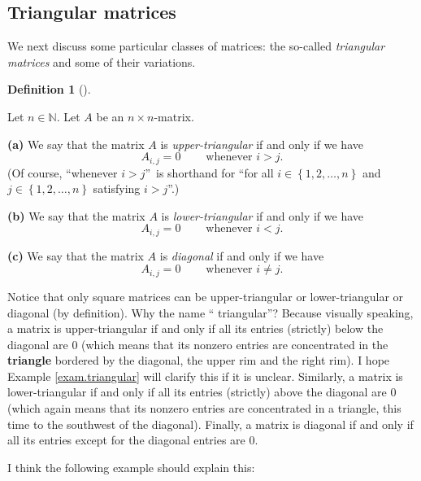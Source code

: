 \documentclass[numbers=enddot,12pt,final,onecolumn,notitlepage]{scrartcl}%
\theoremstyle{definition}
\newtheorem{defi}[theo]{Definition}
\newenvironment{definition}[1][]
{\begin{defi}[#1]\begin{leftbar}}
{\end{leftbar}\end{defi}}
\begin{document}
\subsection{Triangular matrices}

We next discuss some particular classes of matrices: the so-called
\textit{triangular matrices} and some of their variations.

\begin{definition}
\label{def.triangular}Let $n\in\mathbb{N}$. Let $A$ be an $n\times n$-matrix.

\textbf{(a)} We say that the matrix $A$ is \textit{upper-triangular} if and
only if we have%
\[
A_{i,j}=0\ \ \ \ \ \ \ \ \ \ \text{whenever }i>j.
\]
(Of course, \textquotedblleft whenever $i>j$\textquotedblright\ is shorthand
for \textquotedblleft for all $i\in\left\{  1,2,\ldots,n\right\}  $ and
$j\in\left\{  1,2,\ldots,n\right\}  $ satisfying $i>j$\textquotedblright.)

\textbf{(b)} We say that the matrix $A$ is \textit{lower-triangular} if and
only if we have%
\[
A_{i,j}=0\ \ \ \ \ \ \ \ \ \ \text{whenever }i<j.
\]


\textbf{(c)} We say that the matrix $A$ is \textit{diagonal} if and only if we
have%
\[
A_{i,j}=0\ \ \ \ \ \ \ \ \ \ \text{whenever }i\neq j.
\]

\end{definition}

Notice that only square matrices can be upper-triangular or lower-triangular
or diagonal (by definition). Why the name \textquotedblleft
triangular\textquotedblright? Because visually speaking, a matrix is
upper-triangular if and only if all its entries (strictly) below the diagonal
are $0$ (which means that its nonzero entries are concentrated in the
\textbf{triangle} bordered by the diagonal, the upper rim and the right rim).
I hope Example \ref{exam.triangular} will clarify this if it is unclear.
Similarly, a matrix is lower-triangular if and only if all its entries
(strictly) above the diagonal are $0$ (which again means that its nonzero
entries are concentrated in a triangle, this time to the southwest of the
diagonal). Finally, a matrix is diagonal if and only if all its entries except
for the diagonal entries are $0$.

I think the following example should explain this:
\end{document}
